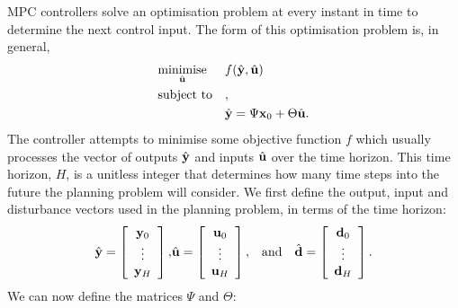 MPC controllers solve an optimisation problem at every instant in time to determine the next control input.
The form of this optimisation problem is, in general,
\begin{equation}
   \label{eq:mpc-opt}
   \optimise
      {minimise}{\hvec{u}}
      {f(\hvec{y}, \hvec{u})}
      {\hvec{y} = \Psi \vec{x}_0 + \Theta \hvec{u}}
\end{equation}
The controller attempts to minimise some objective function $f$ which usually processes the vector of outputs $\hat{\mathbf{y}}$ and inputs $\hat{\mathbf{u}}$ over the time horizon.
This time horizon, $H$, is a unitless integer that determines how many time steps into the future the planning problem will consider.
We first define the output, input and disturbance vectors used in the planning problem, in terms of the time horizon:
\begin{eqnarray}
   \label{eq:mpc-vectors}
   \hat{\mathbf{y}} = \left[\begin{array}{c}
      \mathbf{y}_0 \\
      \vdots \\
      \mathbf{y}_H
   \end{array}\right],
   &
   \hat{\mathbf{u}} = \left[\begin{array}{c}
      \mathbf{u}_0 \\
      \vdots \\
      \mathbf{u}_H
   \end{array}\right],
   & \text{and} \quad
   \hat{\mathbf{d}} = \left[\begin{array}{c}
      \mathbf{d}_0 \\
      \vdots \\
      \mathbf{d}_H
   \end{array}\right].
\end{eqnarray}
We can now define the matrices $\Psi$ and $\Theta$:
